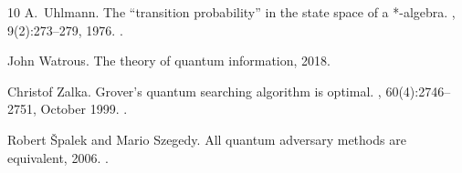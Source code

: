 \documentclass[10pt,a4paper]{article}
\begin{document}
\begin{thebibliography}{10}
A.~Uhlmann.
\newblock The “transition probability” in the state space of a *-algebra.
, 9(2):273--279, 1976.
\newblock \href {https://doi.org/10.1016/0034-4877(76)90060-4} {}.

John Watrous.
\newblock The theory of quantum information, 2018.

Christof Zalka.
\newblock Grover’s quantum searching algorithm is optimal.
, 60(4):2746–2751, October 1999.
\newblock \href {https://doi.org/10.1103/physreva.60.2746} {}.

Robert Špalek and Mario Szegedy.
\newblock All quantum adversary methods are equivalent, 2006.
\newblock \href {https://arxiv.org/abs/quant-ph/0409116} {}.

\end{thebibliography}
\end{document}

